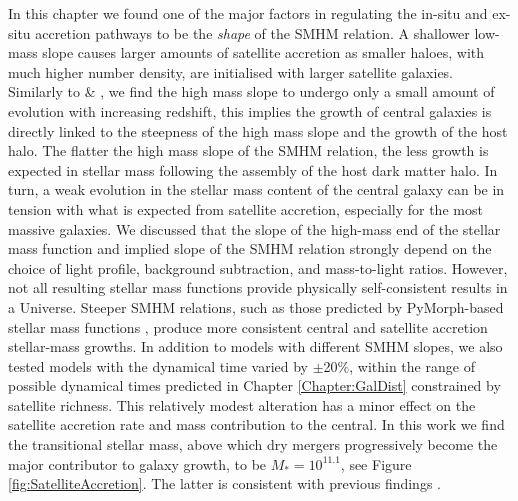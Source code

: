 In this chapter we found one of the major factors in regulating the in-situ and ex-situ accretion pathways to be the \textit{shape} of the SMHM relation. A shallower low-mass slope causes larger amounts of satellite accretion as smaller haloes, with much higher number density, are initialised with larger satellite galaxies. Similarly to \citet{Shankar2006NewFormation} \& \citet{Moster2018Emerge10}, we find the high mass slope to undergo only a small amount of evolution with increasing redshift, this implies the growth of central galaxies is directly linked to the steepness of the high mass slope and the growth of the host halo. The flatter the high mass slope of the SMHM relation, the less growth is expected in stellar mass following the assembly of the host dark matter halo. In turn, a weak evolution in the stellar mass content of the central galaxy can be in tension with what is expected from satellite accretion, especially for the most massive galaxies. We discussed that the slope of the high-mass end of the stellar mass function and implied slope of the SMHM relation strongly depend on the choice of light profile, background subtraction, and mass-to-light ratios. However, not all resulting stellar mass functions provide physically self-consistent results in a \LCDM Universe. Steeper SMHM relations, such as those predicted by PyMorph-based stellar mass functions \citep{Bernardi2013TheProfile}, produce more consistent central and satellite accretion stellar-mass growths. In addition to models with different SMHM slopes, we also tested models with the dynamical time varied by $\pm$20$\%$, within the range of possible dynamical times predicted in Chapter \ref{Chapter:GalDist} constrained by satellite richness. This relatively modest alteration has a minor effect on the satellite accretion rate and mass contribution to the central. In this work we find the transitional stellar mass, above which dry mergers progressively become the major contributor to galaxy growth, to be $M_{*} = 10^{11.1}$, see Figure \ref{fig:SatelliteAccretion}. The latter is consistent with previous findings \citep[e.g.,][]{Bernardi2011EvidenceRelations, Cappellari2013EffectEvolution, Shankar2013SizeUniverse}.

